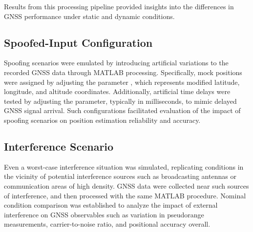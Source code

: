         \noindent Results from this processing pipeline provided insights into the differences in GNSS performance under static and dynamic conditions.
    
    \subsection{Spoofed-Input Configuration}

        Spoofing scenarios were emulated by introducing artificial variations to the recorded GNSS data through MATLAB processing. 
        Specifically, mock positions were assigned by adjusting the parameter , which represents modified latitude, longitude, and altitude coordinates. 
        Additionally, artificial time delays were tested by adjusting the  parameter, typically in milliseconds, to mimic delayed GNSS signal arrival. 
        Such configurations facilitated evaluation of the impact of spoofing scenarios on position estimation reliability and accuracy.

    \subsection{Interference Scenario}
    
        Even a worst-case interference situation was simulated, replicating conditions in the vicinity of potential interference sources such as broadcasting antennas or communication areas of high density. 
        GNSS data were collected near such sources of interference, and then processed with the same MATLAB procedure. 
        Nominal condition comparison was established to analyze the impact of external interference on GNSS observables such as variation in pseudorange measurements, carrier-to-noise ratio, and positional accuracy overall.
